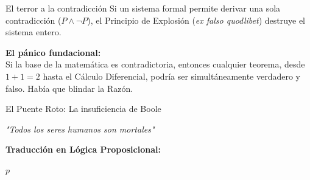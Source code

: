 \documentclass[10pt, aspectratio=169]{beamer}
\begin{document}
\begin{frame}{El terror a la contradicción}
    \vspace{0.5cm}
    \Large
    Si un sistema formal permite derivar una sola contradicción ($P \land \neg P$), el Principio de Explosión (\textit{ex falso quodlibet}) destruye el sistema entero.
    
    \vspace{0.8cm}
    \normalsize
    \alert{\textbf{El pánico fundacional:}} \\
    \vspace{0.3cm}
    Si la base de la matemática es contradictoria, entonces cualquier teorema, desde $1+1=2$ hasta el Cálculo Diferencial, podría ser simultáneamente verdadero y falso. Había que blindar la Razón.
\end{frame}



\begin{frame}{El Puente Roto: La insuficiencia de Boole}
    \begin{center}
        \Large \textit{"Todos los seres humanos son mortales"}
        
        \vspace{0.8cm}
        \textbf{Traducción en Lógica Proposicional:}
        
        \vspace{0.4cm}
        \Huge $p$
    \end{center}
\end{frame}
\end{document}
